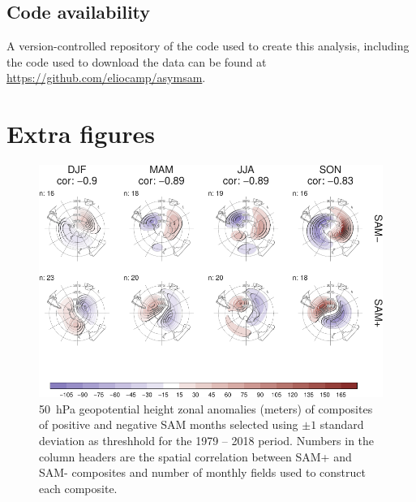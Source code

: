 \documentclass[smallextended]{svjour3}       %
\begin{document}
\hypertarget{code-availability}{%
\subsection*{Code availability}\label{code-availability}}

A version-controlled repository of the code used to create this analysis, including the code used to download the data can be found at \url{https://github.com/eliocamp/asymsam}.

\newpage

\appendix


\hypertarget{extra-figures}{%
\section{Extra figures}\label{extra-figures}}

\newpage

\begin{figure}
\includegraphics{A3-1} \caption{50~hPa geopotential height zonal anomalies (meters) of composites of positive and negative SAM months selected using $\pm1$ standard deviation as threshhold for the 1979 -- 2018 period. Numbers in the column headers are the spatial correlation between SAM+ and SAM- composites and number of monthly fields used to construct each composite.}\label{fig:A3}
\end{figure}
\end{document}
